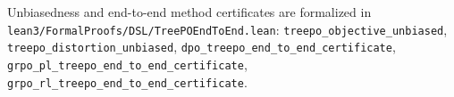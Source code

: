 \documentclass[11pt]{article}
\begin{document}
Unbiasedness and end-to-end method certificates are formalized in
\texttt{lean3/FormalProofs/DSL/TreePOEndToEnd.lean}:
\texttt{treepo\_objective\_unbiased},
\texttt{treepo\_distortion\_unbiased},
\texttt{dpo\_treepo\_end\_to\_end\_certificate},
\texttt{grpo\_pl\_treepo\_end\_to\_end\_certificate},
\texttt{grpo\_rl\_treepo\_end\_to\_end\_certificate}.
\end{document}
